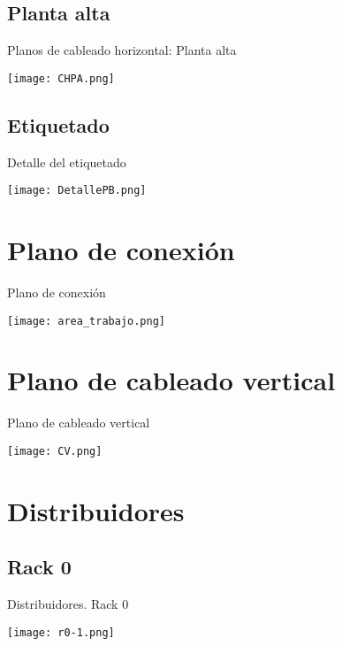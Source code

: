 \documentclass{beamer}
\begin{document}
\subsection{Planta alta}
\begin{frame}{Planos de cableado horizontal: Planta alta}
\begin{center}
	\texttt{[image: CHPA.png]}
\end{center}
\end{frame}


\subsection{Etiquetado}
\begin{frame}{Detalle del etiquetado}
\begin{center}
	\texttt{[image: DetallePB.png]}
\end{center}
\end{frame}


\section{Plano de conexión}
\begin{frame}{Plano de conexión}
\begin{center}
	\texttt{[image: area\_trabajo.png]}
\end{center}
\end{frame}



\section{Plano de cableado vertical}

\begin{frame}{Plano de cableado vertical}
\begin{center}
	\texttt{[image: CV.png]}
\end{center}	
\end{frame}


\section{Distribuidores}
\subsection{Rack 0}
\begin{frame}{Distribuidores. Rack 0}
\begin{center}
	\texttt{[image: r0-1.png]}
\end{center}
\end{frame}
\end{document}
